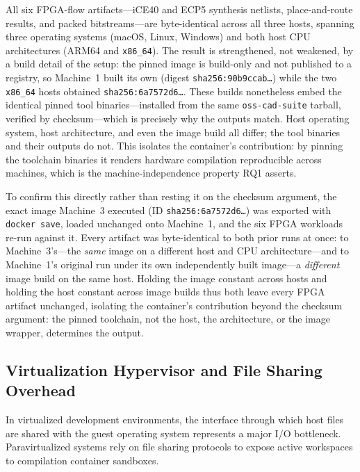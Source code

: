 All six FPGA-flow artifacts---iCE40 and ECP5 synthesis netlists, place-and-route results, and packed bitstreams---are byte-identical across all three hosts, spanning three operating systems (macOS, Linux, Windows) and both host CPU architectures (ARM64 and \texttt{x86\_64}). The result is strengthened, not weakened, by a build detail of the setup: the pinned image is build-only and not published to a registry, so Machine~1 built its own (digest \texttt{sha256:90b9ccab\ldots}) while the two \texttt{x86\_64} hosts obtained \texttt{sha256:6a7572d6\ldots}. These builds nonetheless embed the identical pinned tool binaries---installed from the same \texttt{oss-cad-suite} tarball, verified by checksum---which is precisely why the outputs match. Host operating system, host architecture, and even the image build all differ; the tool binaries and their outputs do not. This isolates the container's contribution: by pinning the toolchain binaries it renders hardware compilation reproducible across machines, which is the machine-independence property RQ1 asserts.

To confirm this directly rather than resting it on the checksum argument, the exact image Machine~3 executed (ID \texttt{sha256:6a7572d6\ldots}) was exported with \texttt{docker save}, loaded unchanged onto Machine~1, and the six FPGA workloads re-run against it. Every artifact was byte-identical to both prior runs at once: to Machine~3's---the \emph{same} image on a different host and CPU architecture---and to Machine~1's original run under its own independently built image---a \emph{different} image build on the same host. Holding the image constant across hosts and holding the host constant across image builds thus both leave every FPGA artifact unchanged, isolating the container's contribution beyond the checksum argument: the pinned toolchain, not the host, the architecture, or the image wrapper, determines the output.

\subsection{Virtualization Hypervisor and File Sharing Overhead}
In virtualized development environments, the interface through which host files are shared with the guest operating system represents a major I/O bottleneck. Paravirtualized systems rely on file sharing protocols to expose active workspaces to compilation container sandboxes. 

